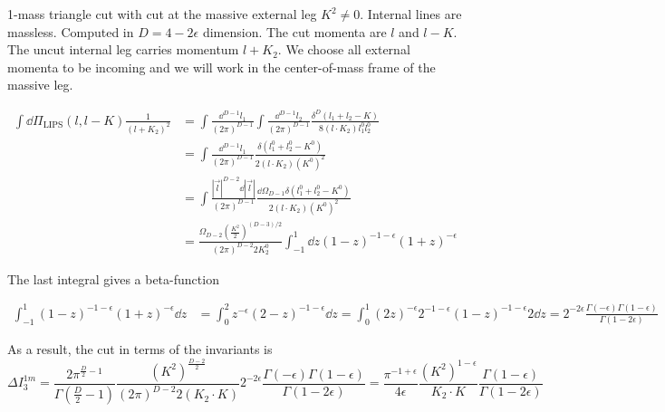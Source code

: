 1-mass triangle cut with cut at the massive external leg $K^2 \neq 0$.
Internal lines are massless. 
Computed in $D=4-2\epsilon$ dimension.
The cut momenta are $l$ and $l-K$.
The uncut internal leg carries momentum $l + K_2$. 
We choose all external momenta to be incoming and we will work in the center-of-mass frame of the massive leg.

\begin{equation*}
\begin{split}
\int\dd \Pi_{\textrm{LIPS}}(l, l-K) \frac{1}{(l+K_2)^2} & =
\int\frac{\dd^{D-1}l_1}{(2\pi)^{D-1}}\int\frac{\dd^{D-1}l_2}{(2\pi)^{D-1}}
\frac{\delta^{D}(l_1 + l_2 - K)}{8(l\cdot K_2)l_1^0 l_2^0}
\\
& = \int\frac{\dd^{D-1}l_1}{(2\pi)^{D-1}}\frac{\delta(l_1^0 + l_2^0 - K^0)}{2(l\cdot K_2)(K^0)^2} 
\\
& = \int\frac{|\vec{l}|^{D-2}\dd |\vec{l}|}{(2\pi)^{D-1}} \frac{\dd\Omega_{D-1}\delta(l_1^0 + l_2^0 - K^0)}{2 ( l \cdot K_2)(K^0)^2}
\\
& = \frac{\Omega_{D-2}(\frac{K^2}{2})^{(D-3)/2}}{(2\pi)^{D-2}2K_2^0} \int_{-1}^1\dd z (1-z)^{-1-\epsilon}(1+z)^{-\epsilon}
\end{split} 
\end{equation*}

The last integral gives a beta-function

\begin{equation*}
\begin{split}
\int^1_{-1} (1-z)^{-1-\epsilon}(1+z)^{-\epsilon} \dd z & = 
\int^2_{0} z^{-\epsilon}(2-z)^{-1-\epsilon} \dd z 
=\int^1_0(2z)^{-\epsilon} 2^{-1-\epsilon} (1-z)^{-1-\epsilon} 2 \dd z
=2^{-2\epsilon}\frac{\Gamma(-\epsilon)\Gamma(1-\epsilon)}{\Gamma(1-2\epsilon)}
\end{split}
\end{equation*}

As a result, the cut in terms of the invariants is
\begin{equation*}
\Delta I_3^{1m} = 
\frac{2\pi^{\frac{D}{2}-1}}{\Gamma(\frac{D}{2}-1)}\frac{(K^2)^{\frac{D-2}{2}}}{(2\pi)^{D-2}2(K_2\cdot K)} 2^{-2\epsilon}\frac{\Gamma(-\epsilon)\Gamma(1-\epsilon)}{\Gamma(1-2\epsilon)}
=
\frac{\pi^{-1+\epsilon}}{4\epsilon}\frac{(K^{2})^{1-\epsilon}}{K_2\cdot K}\frac{\Gamma(1-\epsilon)}{\Gamma(1-2\epsilon)}
\end{equation*}